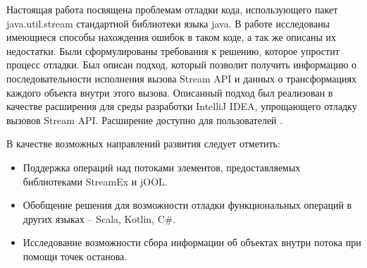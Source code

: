 Настоящая работа посвящена проблемам отладки кода, использующего пакет \\ java.util.stream стандартной библиотеки языка java. В работе исследованы имеющиеся способы нахождения ошибок в таком коде, а так же описаны их недостатки. Были сформулированы требования к решению, которое упростит процесс отладки. Был описан подход, который позволит получить информацию о последовательности исполнения вызова Stream API и данных о трансформациях каждого объекта внутри этого вызова. Описанный подход был реализован в качестве расширения для среды разработки IntelliJ IDEA, упрощающего отладку вызовов Stream API. Расширение доступно для пользователей \cite{java:stream-debugger}.

В качестве возможных направлений развития следует отметить:
\begin{itemize}
	\item Поддержка операций над потоками элементов, предоставляемых библиотеками StreamEx и jOOL.
	\item Обобщение решения для возможности отладки функциональных операций в других языках -- Scala, Kotlin, C\#.
	\item Исследование возможности сбора информации об объектах внутри потока при помощи точек останова.
\end{itemize}